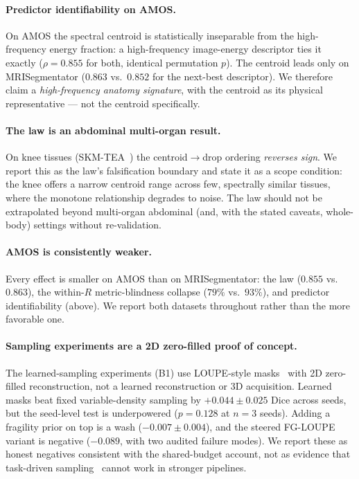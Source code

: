 \documentclass[10pt,twocolumn,letterpaper]{article}
\begin{document}
\paragraph{Predictor identifiability on AMOS.}
On AMOS the spectral centroid is statistically inseparable from the high-frequency energy fraction: a high-frequency image-energy descriptor ties it exactly ($\rho=0.855$ for both, identical permutation $p$). The centroid leads only on MRISegmentator ($0.863$ vs.\ $0.852$ for the next-best descriptor). We therefore claim a \emph{high-frequency anatomy signature}, with the centroid as its physical representative --- not the centroid specifically.

\paragraph{The law is an abdominal multi-organ result.}
On knee tissues (SKM-TEA~\cite{desai2022skmtea}) the centroid$\rightarrow$drop ordering \emph{reverses sign}. We report this as the law's falsification boundary and state it as a scope condition: the knee offers a narrow centroid range across few, spectrally similar tissues, where the monotone relationship degrades to noise. The law should not be extrapolated beyond multi-organ abdominal (and, with the stated caveats, whole-body) settings without re-validation.

\paragraph{AMOS is consistently weaker.}
Every effect is smaller on AMOS than on MRISegmentator: the law ($0.855$ vs.\ $0.863$), the within-$R$ metric-blindness collapse ($79\%$ vs.\ $93\%$), and predictor identifiability (above). We report both datasets throughout rather than the more favorable one.

\paragraph{Sampling experiments are a 2D zero-filled proof of concept.}
The learned-sampling experiments (B1) use LOUPE-style masks~\cite{bahadir2020loupe} with 2D zero-filled reconstruction, not a learned reconstruction or 3D acquisition. Learned masks beat fixed variable-density sampling by $+0.044 \pm 0.025$ Dice across seeds, but the seed-level test is underpowered ($p=0.128$ at $n=3$ seeds). Adding a fragility prior on top is a wash ($-0.007 \pm 0.004$), and the steered FG-LOUPE variant is negative ($-0.089$, with two audited failure modes). We report these as honest negatives consistent with the shared-budget account, not as evidence that task-driven sampling~\cite{razumov2023,huijben2020,weiss2021} cannot work in stronger pipelines.
\end{document}
